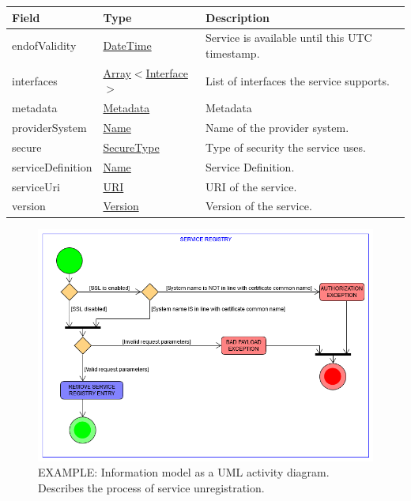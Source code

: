 \documentclass[a4paper]{arrowhead}
\newcommand{\pref}[1]{{\textcolor{ArrowheadGrey}{\hyperref[sec:model:primitives:#1]{#1}}}}
\begin{document}
\begin{table}[ht!]
\begin{tabularx}{\textwidth}{| p{4.25cm} | p{3.5cm} | X |} \hline
\rowcolor{gray!33} Field & Type      & Description \\ \hline
endofValidity                 & \pref{DateTime} & Service is available until this UTC timestamp. \\ \hline
interfaces                   & \pref{Array}$<$\pref{Interface}$>$     & List of interfaces the service supports. \\ \hline
metadata                  & \pref{Metadata}     & Metadata \\ \hline
providerSystem                    & \pref{Name} & Name of the provider system. \\ \hline
secure                   &\pref{SecureType}  & Type of security the service uses. \\ \hline
serviceDefinition         &\pref{Name}        & Service Definition. \\ \hline
serviceUri                &\pref{URI}         & URI of the service. \\ \hline
version                   &\pref{Version}     & Version of the service. \\ \hline
\end{tabularx}
\end{table}

\begin{figure}[ht!]
  \centering
  \includegraphics[width=\textwidth]{figures/delete_service_registry_unregister_activity_uml.png}
  \caption{\color{red}  EXAMPLE:
    Information model as a UML activity diagram.
    Describes the process of service unregistration.
    \color{black}
  }
  \label{fig:unregister_overview}
\end{figure}
\end{document}
